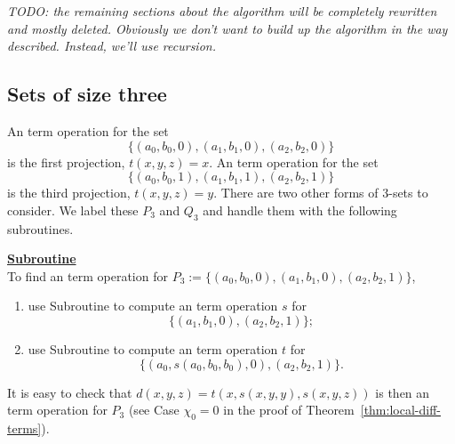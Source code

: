 
\noindent \emph{TODO: the remaining sections about the algorithm will be completely
rewritten and mostly deleted.  Obviously we don't want to build up the 
algorithm in the way described.  Instead, we'll use recursion.}

\subsection{Sets of size three}
An \ld term operation for the set
\begin{equation*}
\{(a_0,b_0, 0), (a_1, b_1, 0), (a_2, b_2, 0)\}
\end{equation*}
is the first projection, $t(x,y,z) = x$.
An \ld term operation for the set
\begin{equation*}
\{(a_0,b_0,1), (a_1, b_1, 1), (a_2, b_2, 1)\}
\end{equation*}
is the third projection, $t(x,y,z) = y$.
There are two other forms of 3-sets to consider.
We label these $P_3$ and $Q_3$ and handle them with 
the following subroutines.

\medskip

\noindent \underline{\textbf{Subroutine }}\\[4pt]
To find an \ld term operation for
$P_3:=\{(a_0, b_0, 0), (a_1, b_1, 0),  (a_2, b_2, 1)\}$,
\begin{enumerate}
\item use Subroutine  to compute an \ld term operation $s$ for
\begin{equation*}
\{(a_1, b_1, 0), (a_2, b_2, 1)\}; 
\end{equation*}
\item use Subroutine  to compute an \ld term operation $t$ for
\begin{equation*}
\{(a_0, s(a_0, b_0, b_0), 0), (a_2, b_2, 1)\}.
\end{equation*}
\end{enumerate}
It is easy to check that
$d(x,y,z) = t(x, s(x,y,y), s(x,y,z))$
is then an \ld term operation for $P_3$ 
(see Case $\chi_0=0$ in the proof of Theorem~\ref{thm:local-diff-terms}).

